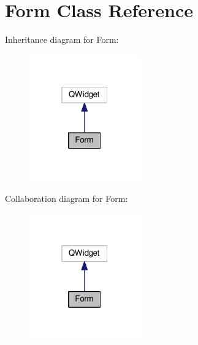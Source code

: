 \hypertarget{class_form}{}\section{Form Class Reference}
\label{class_form}


Inheritance diagram for Form\+:
\nopagebreak
\begin{figure}[H]
\begin{center}
\leavevmode
\includegraphics[width=135pt]{class_form__inherit__graph}
\end{center}
\end{figure}


Collaboration diagram for Form\+:
\nopagebreak
\begin{figure}[H]
\begin{center}
\leavevmode
\includegraphics[width=135pt]{class_form__coll__graph}
\end{center}
\end{figure}
